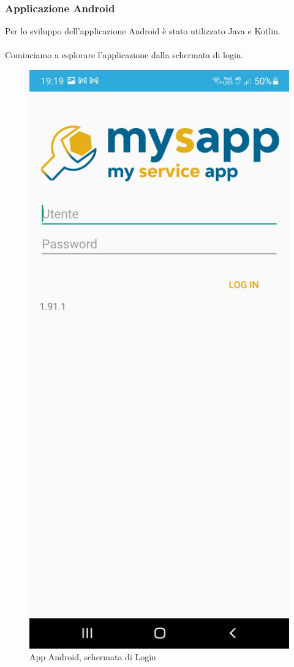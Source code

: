 \subsubsection{Applicazione Android}
Per lo sviluppo dell'applicazione Android è stato utilizzato Java e Kotlin.\\\\
Cominciamo a esplorare l'applicazione dalla schermata di login.\\
\begin{figure}[!h] 
	\centering 
	\includegraphics[scale = 0.2]{immagini/app Android/login-android.jpeg} 
	\caption {App Android, schermata di Login}
\end{figure}
